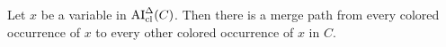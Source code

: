 \documentclass[,%
	paper=a4,%
	DIV11, %
	twoside=false,%
	liststotoc,
	bibtotoc,
	draft=false,%
	numbers=noendperiod
]{scrartcl}
\begin{document}
\begin{clemma}
	\label{lemma:arrow_from_all_colored_to_all_colored}
	Let $x$ be a variable in $\operatorname{AI}_\mathrm{cl}^\Delta(C)$.
	Then there is a merge path from every colored occurrence of $x$ to every other colored occurrence of $x$ in $C$.
\end{clemma}
\begin{comment}
	\begin{proof}

		Induction start: by definition.

		Suppose holds for $C_1$ and $C_2$, usual notation.

		We consider introductions of colored occurrences of $x$.

		\begin{description}
			\item [Suppose $x$ is introduced in $t$ by means of unification.]
				$t\sigma$ contains $x$, hence there is a variable $y$ in $t$ such that $y\sigma = s\occ{x}$.

				\cbstart
				Let $\bhat y$ be the position of $y$ which causes the variable to be changed by the unification algorithm.
				$\bhat y$ is in a resolved literal, say $l$, so we denote it by $l\at{\bhat y}$ and its counterpart in $l'$ by $l'\at{\bhat y}$
				\cbend\comm{copied}

				\begin{itemize}
					\item 
						Suppose $l\at{\bhat y}$ is a grey occurrence.
						$l'\at{\bhat y}$ is an abstraction of $s\occ{x}$.
						\mytodo{}

					\item
						Suppose $l\at{\bhat y}$ is a colored occurrence.
						Then by the induction hypothesis, $l\at{\bhat y} \mpath \bdot y$ for every other colored occurrence $\bdot y$ of $y$. As the substitution $s\occ{x}$ for $y$, there are merge edges between all these occurrences.

						For the grey occurrences of $y$ \mytodo{}

				\end{itemize}


			\item [Suppose a colored term $t\occ{x}$ containing $x$ is in $\ran(\sigma)$.]
		\end{description}

	\end{proof}
\end{comment}
\end{document}

